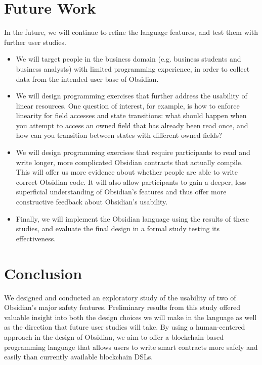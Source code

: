 \documentclass[sigplan,10pt,review]{acmart}\settopmatter{printfolios=true}
\begin{document}
\section{Future Work}

In the future, we will continue to refine the language features, and test them with further user studies.\begin{itemize}
\item We will target people in the business domain (e.g. business students and business analysts) with limited
programming experience, in order to collect data from the intended user base of Obsidian.
\item We will design programming exercises that further address the usability of linear resources. One question
of interest, for example, is how to enforce linearity for field accesses and state transitions: what should happen
when you attempt to access an owned field that has already been read once, and how can you transition
between states with different owned fields? 
\item We will design programming exercises that require participants to read and write longer, more complicated 
Obsidian contracts that actually compile. This will offer us more evidence about whether people are able to write 
correct Obsidian code. It will also allow participants to gain a deeper, less superficial understanding of Obsidian's 
features and thus offer more constructive feedback about Obsidian's usability. 
\item Finally, we will implement the Obsidian language using the results of these studies, 
and evaluate the final design in a formal study testing its effectiveness.
\end{itemize}

\section{Conclusion}

We designed and conducted an exploratory study of the usability of two of Obsidian's major safety features. 
Preliminary results from this study offered valuable insight into both the design choices we will make in the 
language as well as the direction that future user studies will take. By using a human-centered approach in the 
design of Obsidian, we aim to offer a blockchain-based programming language that allows users to write smart 
contracts more safely and easily than currently available blockchain DSLs.


\end{document}
